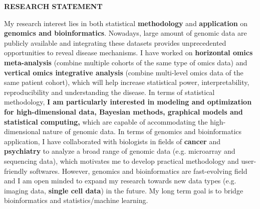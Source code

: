 \documentclass[a4paper, 10pt]{article}
\begin{document}
\thispagestyle{fancy}
\lhead{}
\rhead{}
\renewcommand{\headrulewidth}{0pt} 
\renewcommand{\footrulewidth}{0pt} 


\pagestyle{fancy}
\lhead{\textcolor{gray}{\it Zhiguang Huo (Caleb)}}


\begin{center}
{\LARGE \bf RESEARCH STATEMENT}\\
\vspace*{0.1cm}
\end{center}


My research interest lies in both statistical \textbf{methodology} and \textbf{application} on \textbf{genomics and bioinformatics}.
Nowadays, large amount of genomic data are publicly available and 
integrating these datasets provides unprecedented opportunities to reveal disease mechanisms.
I have worked on \textbf{horizontal omics meta-analysis} (combine multiple cohorts of the same type of omics data) and 
\textbf{vertical omics integrative analysis} (combine multi-level omics data of the same patient cohort),
which will help increase statistical power, interpretability, reproducibility and understanding the disease.
In terms of statistical methodology,
\textbf{I am particularly interested in modeling and optimization for high-dimensional data, Bayesian methods, graphical models and statistical computing,}
which are capable of accommodating the high-dimensional nature of genomic data.
In terms of genomics and bioinformatics application,
I have collaborated with biologists in fields of \textbf{cancer} and \textbf{psychiatry} to analyze a broad range of genomic data (e.g. microarray and sequencing data),
which motivates me to develop practical methodology and user-friendly softwares.
However, genomics and bioinformatics are fast-evolving field and 
I am open minded to expand my research towards new data types (e.g. imaging data, \textbf{single cell data}) in the future.
My long term goal is to bridge bioinformatics and statistics/machine learning.
\end{document}

